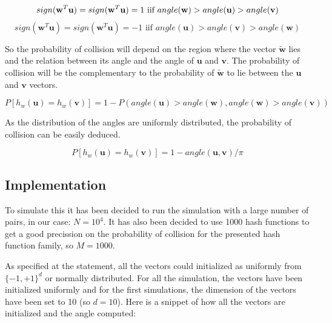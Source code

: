 \documentclass{ethz_report}
\begin{document}
\begin{equation}
    sign(\mathbf{w}^T\mathbf{u}) = sign(\mathbf{w}^T\mathbf{u}) = 1 \text{ iif } angle(\mathbf{w}) > angle(\mathbf{u}) > angle(\mathbf{v}) \\
\end{equation}
\begin{equation}
    sign(\mathbf{w}^T\mathbf{u}) = sign(\mathbf{w}^T\mathbf{u}) = -1 \text{ iif } angle(\mathbf{u}) > angle(\mathbf{v}) > angle(\mathbf{w})
\end{equation}

So the probability of collision will depend on the region where the vector $\mathbf{\tilde{w}}$ lies and the relation between its angle and the angle of $\mathbf{u}$ and $\mathbf{v}$.
The probability of collision will be the complementary to the probability of $\mathbf{\tilde{w}}$ to lie between the $\mathbf{u}$ and $\mathbf{v}$ vectors.

\begin{equation}
    P[h_w(\mathbf{u}) = h_w(\mathbf{v})] = 1 - P(angle(\mathbf{u}) > angle(\mathbf{w}), angle(\mathbf{w}) > angle(\mathbf{v}))
\end{equation}

As the distribution of the angles are uniformly distributed, the probability of collision can be easily deduced.

\begin{equation}
    P[h_w(\mathbf{u}) = h_w(\mathbf{v})] = 1 - angle(\mathbf{u}, \mathbf{v}) / \pi
\end{equation}

\subsection*{Implementation}

To simulate this it has been decided to run the simulation with a large number of pairs, in our case: $N = 10^4$. It has also been decided to use 1000 hash functions to get a good precission on the probability of collision for the presented hash function family, so $M = 1000$.

As specified at the statement, all the vectors could initialized as uniformly from $\{-1,+1\}^d$ or normally distributed. For all the simulation, the vectors have been initialized uniformly and for the first simulations, the dimension of the vectors have been set to 10 (so $d=10$). Here is a snippet of how all the vectors are initialized and the angle computed:


\end{document}
